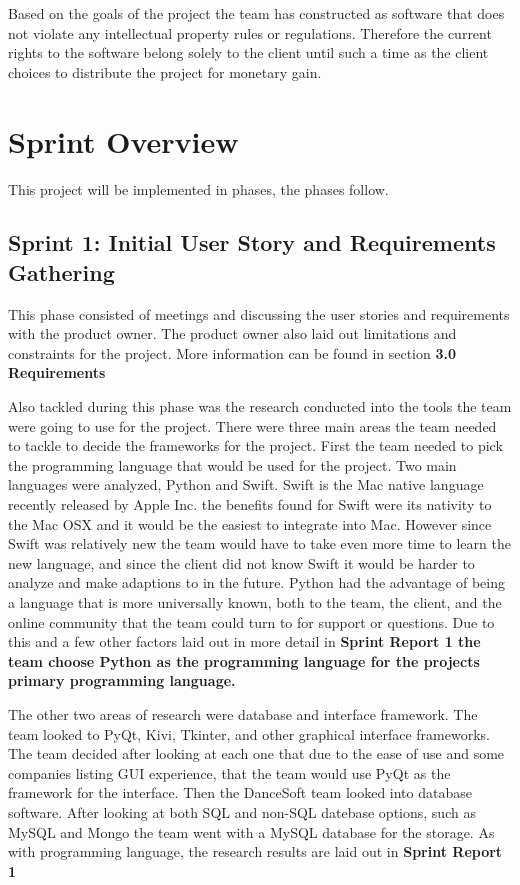 Based on the goals of the project the team has constructed as software that does not violate any intellectual property rules or regulations. Therefore the current rights to the software belong solely to the client until such a time as the client choices to distribute the project for monetary gain.  

\section{Sprint  Overview}
This project will be implemented in phases, the phases follow.

\subsection{Sprint 1: Initial User Story and Requirements Gathering}
This phase consisted of meetings and discussing the user stories and requirements with the product owner. The product owner also laid out limitations and constraints for the project. More information can be found in section \bf 3.0 Requirements \rm

Also tackled during this phase was the research conducted into the tools the team were going to use for the project. There were three main areas the team needed to tackle to decide the frameworks for the project. First the team needed to pick the programming language that would be used for the project. Two main languages were analyzed, Python and Swift. Swift is the Mac native language recently released by Apple Inc. the benefits found for Swift were its nativity to the Mac OSX and it would be the easiest to integrate into Mac. However since Swift was relatively new the team would have to take even more time to learn the new language, and since the client did not know Swift it would be harder to analyze and make adaptions to in the future. Python had the advantage of being a language that is more universally known, both to the team, the client, and the online community that the team could turn to for support or questions. Due to this and a few other factors laid out in more detail in \bf Sprint Report 1 \rm the team choose Python as the programming language for the projects primary programming language.

The other two areas of research were database and interface framework. The team looked to PyQt, Kivi, Tkinter, and other graphical interface frameworks. The team decided after looking at each one that due to the ease of use and some companies listing GUI experience, that the team would use PyQt as the framework for the interface. Then the DanceSoft team looked into database software. After looking at both SQL and non-SQL datebase options, such as MySQL and Mongo the team went with a MySQL database for the storage. As with programming language, the research results are laid out in \bf Sprint Report 1 \rm   

